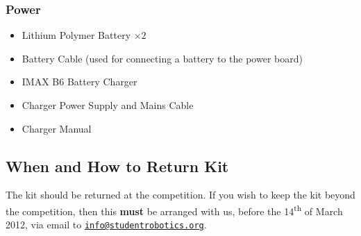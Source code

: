 \subsubsection {Power}

\begin{itemize}
 \item Lithium Polymer Battery $\times 2$
 \item Battery Cable (used for connecting a battery to the power board)
 \item IMAX B6 Battery Charger
 \item Charger Power Supply and Mains Cable
 \item Charger Manual
\end{itemize}

\subsection {When and How to Return Kit}

The kit should be returned at the competition.  If you wish to keep the kit beyond the competition, then this \textbf{must} be arranged with us, before the 14\textsuperscript{th} of March 2012, via email to \href{mailto:info@studentrobotics.org}{\nolinkurl{info@studentrobotics.org}}.
